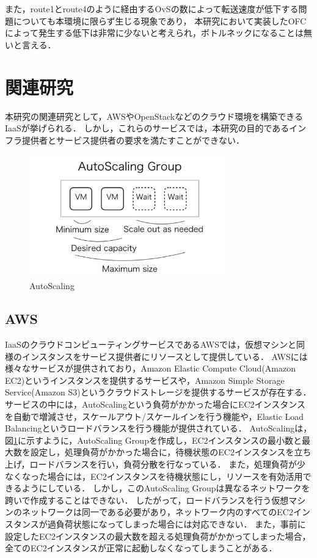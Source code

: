 \documentclass[submit,techrep]{ipsj}
\begin{document}
また，route1とroute4のように経由するOvSの数によって転送速度が低下する問題についても本環境に限らず生じる現象であり，
本研究において実装したOFCによって発生する低下は非常に少ないと考えられ，ボトルネックになることは無いと言える．




\section{関連研究}
本研究の関連研究として，AWSやOpenStackなどのクラウド環境を構築できるIaaSが挙げられる．
しかし，これらのサービスでは，本研究の目的であるインフラ提供者とサービス提供者の要求を満たすことができない．

\begin{figure}[tb]
	\includegraphics[width=8.5cm,bb=0 0 513 320]{fig/autoscaling.png}
	\caption{AutoScaling}
	\label{fig:autoscaling}
\end{figure}
\subsection{AWS\cite{aws}}
IaaSのクラウドコンピューティングサービスであるAWSでは，仮想マシンと同様のインスタンスをサービス提供者にリソースとして提供している．
AWSには様々なサービスが提供されており，Amazon Elastic Compute Cloud(Amazon EC2)というインスタンスを提供するサービスや，Amazon Simple Storage Service(Amazon S3)というクラウドストレージを提供するサービスが存在する．
サービスの中には，AutoScalingという負荷がかかった場合にEC2インスタンスを自動で増減させ，スケールアウト/スケールインを行う機能や，Elastic Load Balancingというロードバランスを行う機能が提供されている．
AutoScalingは，図\ref{fig:autoscaling}に示すように，AutoScaling Groupを作成し，EC2インスタンスの最小数と最大数を設定し，処理負荷がかかった場合に，待機状態のEC2インスタンスを立ち上げ，ロードバランスを行い，負荷分散を行なっている．
また，処理負荷が少なくなった場合には，EC2インスタンスを待機状態にし，リソースを有効活用できるようにしている．
しかし，このAutoScaling Groupは異なるネットワークを跨いで作成することはできない．
したがって，ロードバランスを行う仮想マシンのネットワークは同一である必要があり，ネットワーク内のすべてのEC2インスタンスが過負荷状態になってしまった場合には対応できない．
また，事前に設定したEC2インスタンスの最大数を超える処理負荷がかかってしまった場合，全てのEC2インスタンスが正常に起動しなくなってしまうことがある．
\end{document}
